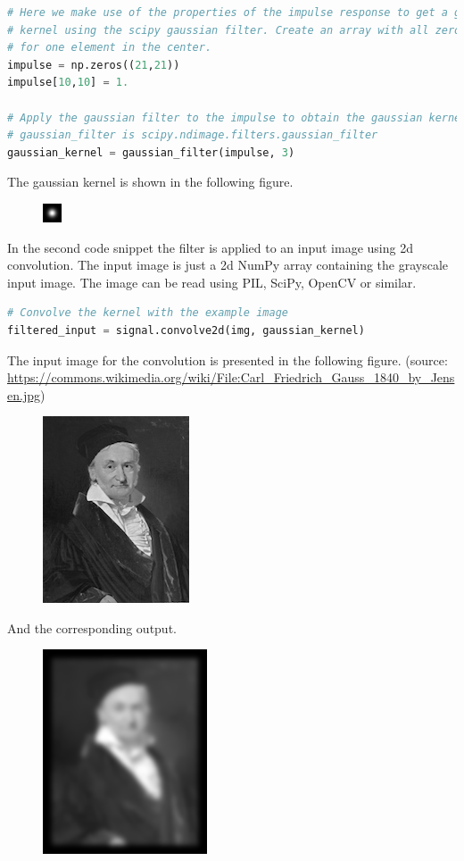 \documentclass[]{article}
\begin{document}
\begin{lstlisting}[language=Python]
# Here we make use of the properties of the impulse response to get a gaussian
# kernel using the scipy gaussian filter. Create an array with all zeros except
# for one element in the center.
impulse = np.zeros((21,21))
impulse[10,10] = 1.

# Apply the gaussian filter to the impulse to obtain the gaussian kernel.
# gaussian_filter is scipy.ndimage.filters.gaussian_filter
gaussian_kernel = gaussian_filter(impulse, 3)
\end{lstlisting}
The gaussian kernel is shown in the following figure.
\begin{figure}
    \includegraphics{kernel.png}
\end{figure}

In the second code snippet the filter is applied to an input image using 2d
convolution. The input image is just a 2d NumPy array containing the grayscale
input image. The image can be read using PIL, SciPy, OpenCV or similar.
\begin{lstlisting}[language=Python]
# Convolve the kernel with the example image
filtered_input = signal.convolve2d(img, gaussian_kernel)
\end{lstlisting}
The input image for the convolution is presented in the following figure. (source: \url{https://commons.wikimedia.org/wiki/File:Carl_Friedrich_Gauss_1840_by_Jensen.jpg})
\begin{figure}
    \includegraphics{input.png}
\end{figure}
And the corresponding output.
\begin{figure}
    \includegraphics{output.png}
\end{figure}
\end{document}
